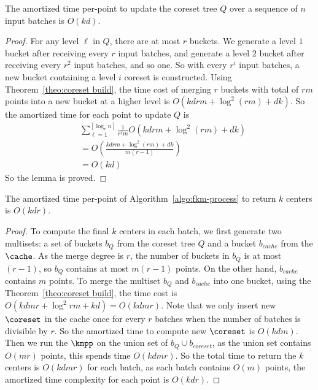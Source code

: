 {%
\begin{lemma}
The amortized time per-point to update the coreset tree $Q$ over a sequence of $n$ input batches is $O(kd)$.
\end{lemma}
\begin{proof}
For any level $\ell$ in $Q$, there are at most $r$ buckets. We generate a level $1$ bucket after receiving every $r$ input batches, and generate a level $2$ bucket after receiving every $r^2$ input batches, and so one. So with every $r^i$ input batches, a new bucket containing a level $i$ coreset is constructed. 
Using Theorem~\ref{theo:coreset build}, the time cost of merging $r$ buckets with total of $rm$ points into a new bucket at a higher level is $O(kdrm+\log^2(rm)+dk)$. 
So the amortized time for each point to update $Q$ is
\[ \begin{split} 
&\sum_{\ell=1}^{\left\lceil \log_r n \right\rceil}\frac{1}{r^{\ell}m}O(kdrm+\log^2(rm)+dk) \\
&=O\left(\frac{kdrm+\log^2(rm)+dk}{m(r-1)}\right) \\
&=O(kd)
\end{split}
\]
So the lemma is proved.
\end{proof}


\begin{lemma}
The amortized time per-point of Algorithm~\ref{algo:fkm-process} to return $k$ centers is $O(kdr)$.
\end{lemma}
\begin{proof}
To compute the final $k$ centers in each batch, we first generate two multisets: a set of buckets $b_Q$ from the coreset tree $Q$ and a bucket $b_{cache}$ from the $\cache$. As the merge degree is $r$, the number of buckets in $b_Q$ is at most $(r-1)$, so $b_Q$ contains at most $m(r-1)$ points. On the other hand, $b_{cache}$ contains $m$ points. To merge the multiset $b_Q$ and $b_{cache}$ into one bucket, using the Theorem~\ref{theo:coreset build}, the time cost is 
$O(kdmr+\log^2rm + kd)=O(kdmr)$. 
Note that we only insert new $\coreset$ in the cache once for every $r$ batches when the number of batches is divisible by $r$. So the amortized time to compute new $\coreset$ is $O(kdm)$.
Then we run the $\kmpp$ on the union set of $b_Q \cup b_{coreset}$, as the union set contains $O(mr)$ points, this spends time $O(kdmr)$. 
So the total time to return the $k$ centers is $O(kdmr)$ for each batch, as each batch contains $O(m)$ points, the amortized time complexity for each point is $O(kdr)$.
\end{proof}


}
